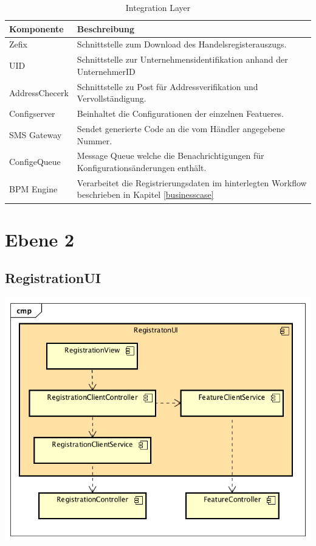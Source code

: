 \begin{table}[H]
	\centering
	\caption{Integration Layer}
	\begin{tabular}{ | p{4cm} | p{12cm} | }
		\toprule
		{\textbf{Komponente}} & {\textbf{Beschreibung}} \\
		\midrule
		Zefix &  Schnittstelle zum Download des Handelsregisterauszugs. \\ \hline
		UID &  Schnittstelle zur Unternehmensidentifikation anhand der UnternehmerID \\ \hline
		AddressChecerk &  Schnittstelle zu Post für Addressverifikation und Vervollständigung. \\ \hline
		Configserver &  Beinhaltet die Configurationen der einzelnen Featueres. \\ \hline
		SMS Gateway &  Sendet generierte Code an die vom Händler angegebene Nummer. \\ \hline
		ConfigeQueue & Message Queue welche die Benachrichtigungen für Konfigurationsänderungen enthält. \\ \hline
		BPM Engine & Verarbeitet die Registrierungsdaten im hinterlegten Workflow beschrieben in Kapitel \ref{businesscase}\\
		\bottomrule
	\end{tabular}
\end{table}
\newpage

\section{Ebene 2}

\subsection{RegistrationUI}

\begin{center}
	\includegraphics[scale=0.8]{WebComponentLevel2.png}
\end{center}
\newpage
